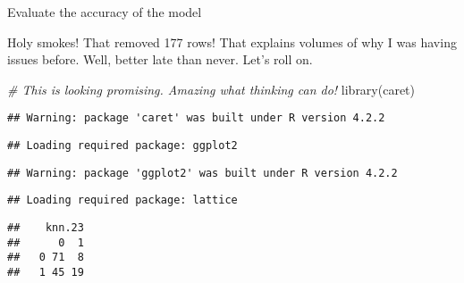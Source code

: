 \documentclass[
  ignorenonframetext,
]{beamer}
\newenvironment{Shaded}{\begin{snugshade}}{\end{snugshade}}
\newcommand{\AttributeTok}[1]{\textcolor[rgb]{0.77,0.63,0.00}{#1}}
\newcommand{\CommentTok}[1]{\textcolor[rgb]{0.56,0.35,0.01}{\textit{#1}}}
\newcommand{\DecValTok}[1]{\textcolor[rgb]{0.00,0.00,0.81}{#1}}
\newcommand{\FloatTok}[1]{\textcolor[rgb]{0.00,0.00,0.81}{#1}}
\newcommand{\FunctionTok}[1]{\textcolor[rgb]{0.00,0.00,0.00}{#1}}
\newcommand{\NormalTok}[1]{#1}
\newcommand{\OtherTok}[1]{\textcolor[rgb]{0.56,0.35,0.01}{#1}}
\newcommand{\SpecialCharTok}[1]{\textcolor[rgb]{0.00,0.00,0.00}{#1}}
\begin{document}
\begin{frame}[fragile]{Evaluate the accuracy of the model}
\begin{block}{Holy smokes! That removed 177 rows! That explains volumes
of why I was having issues before. Well, better late than never. Let's
roll on.}
\begin{Shaded}
\begin{Highlighting}[]
\CommentTok{\# This is looking promising.  Amazing what thinking can do!  }
\FunctionTok{library}\NormalTok{(caret)}
\end{Highlighting}
\end{Shaded}

\begin{verbatim}
## Warning: package 'caret' was built under R version 4.2.2
\end{verbatim}

\begin{verbatim}
## Loading required package: ggplot2
\end{verbatim}

\begin{verbatim}
## Warning: package 'ggplot2' was built under R version 4.2.2
\end{verbatim}

\begin{verbatim}
## Loading required package: lattice
\end{verbatim}

\begin{Shaded}
\end{Shaded}

\begin{verbatim}
##    knn.23
##      0  1
##   0 71  8
##   1 45 19
\end{verbatim}

\begin{Shaded}
\end{Shaded}


\end{block}
\end{frame}
\end{document}
